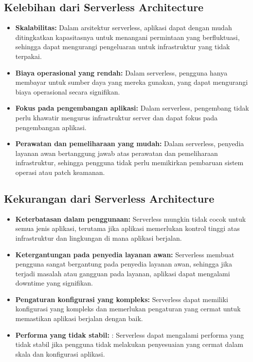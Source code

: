 \subsection{Kelebihan dari Serverless Architecture}

\begin{itemize}
	\item \textbf{Skalabilitas:} Dalam arsitektur serverless, aplikasi dapat dengan mudah ditingkatkan kapasitasnya untuk menangani permintaan yang berfluktuasi, sehingga dapat mengurangi pengeluaran untuk infrastruktur yang tidak terpakai.
	\item \textbf{Biaya operasional yang rendah:} Dalam serverless, pengguna hanya membayar untuk sumber daya yang mereka gunakan, yang dapat mengurangi biaya operasional secara signifikan.
	\item \textbf{Fokus pada pengembangan aplikasi:} Dalam serverless, pengembang tidak perlu khawatir mengurus infrastruktur server dan dapat fokus pada pengembangan aplikasi.
	\item \textbf{Perawatan dan pemeliharaan yang mudah:} Dalam serverless, penyedia layanan awan bertanggung jawab atas perawatan dan pemeliharaan infrastruktur, sehingga pengguna tidak perlu memikirkan pembaruan sistem operasi atau patch keamanan.
\end{itemize}

\subsection{Kekurangan dari Serverless Architecture}

\begin{itemize}
	\item \textbf{Keterbatasan dalam penggunaan:} Serverless mungkin tidak cocok untuk semua jenis aplikasi, terutama jika aplikasi memerlukan kontrol tinggi atas infrastruktur dan lingkungan di mana aplikasi berjalan.
	\item \textbf{Ketergantungan pada penyedia layanan awan:} Serverless membuat pengguna sangat bergantung pada penyedia layanan awan, sehingga jika terjadi masalah atau gangguan pada layanan, aplikasi dapat mengalami downtime yang signifikan.
	\item \textbf{Pengaturan konfigurasi yang kompleks:} Serverless dapat memiliki konfigurasi yang kompleks dan memerlukan pengaturan yang cermat untuk memastikan aplikasi berjalan dengan baik.
	\item \textbf{Performa yang tidak stabil:} : Serverless dapat mengalami performa yang tidak stabil jika pengguna tidak melakukan penyesuaian yang cermat dalam skala dan konfigurasi aplikasi.
\end{itemize}


